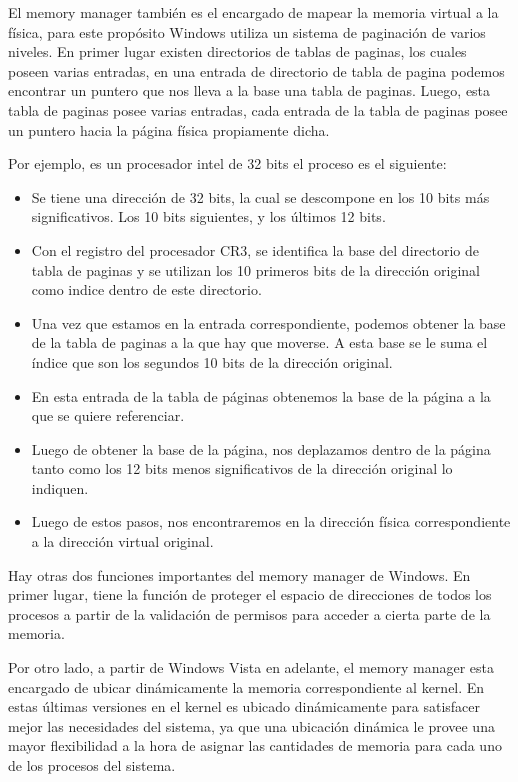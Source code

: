 \documentclass[a4paper, 12pt]{article}
\begin{document}
El memory manager tambi\'en es el encargado de mapear la memoria virtual a la f\'isica, para este prop\'osito Windows utiliza un sistema de paginaci\'on de varios niveles. En primer lugar existen directorios de tablas de paginas, los cuales poseen varias entradas, en una entrada de directorio de tabla de pagina podemos encontrar un puntero que nos lleva a la base una tabla de paginas. Luego, esta tabla de paginas posee varias entradas, cada entrada de la tabla de paginas posee un puntero hacia la p\'agina f\'isica propiamente dicha. 


Por ejemplo, es un procesador intel de 32 bits el proceso es el siguiente:

\begin{itemize}
\item Se tiene una direcci\'on de 32 bits, la cual se descompone en los 10 bits m\'as significativos. Los 10 bits siguientes, y los \'ultimos 12 bits.
\item Con el registro del procesador CR3, se identifica la base del directorio de tabla de paginas y se utilizan los 10 primeros bits de la direcci\'on original como indice dentro de este directorio.
\item Una vez que estamos en la entrada correspondiente, podemos obtener la base de la tabla de paginas a la que hay que moverse. A esta base se le suma el \'indice que son los segundos 10 bits de la direcci\'on original.
\item En esta entrada de la tabla de p\'aginas obtenemos la base de la p\'agina a la que se quiere referenciar. 
\item Luego de obtener la base de la p\'agina, nos deplazamos dentro de la p\'agina tanto como los 12 bits menos significativos de la direcci\'on original lo indiquen.
\item Luego de estos pasos, nos encontraremos en la direcci\'on f\'isica correspondiente a la direcci\'on virtual original.
\end{itemize}


Hay otras dos funciones importantes del memory manager de Windows. En primer lugar, tiene la funci\'on de proteger el espacio de direcciones de todos los procesos a partir de la validaci\'on de permisos para acceder a cierta parte de la memoria.

Por otro lado, a partir de Windows Vista en adelante, el memory manager esta encargado de ubicar din\'amicamente la memoria correspondiente al kernel. En estas \'ultimas versiones en el kernel es ubicado din\'amicamente para satisfacer mejor las necesidades del sistema, ya que una ubicaci\'on din\'amica le provee una mayor flexibilidad a la hora de asignar las cantidades de memoria para cada uno de los procesos del sistema.
\end{document}
